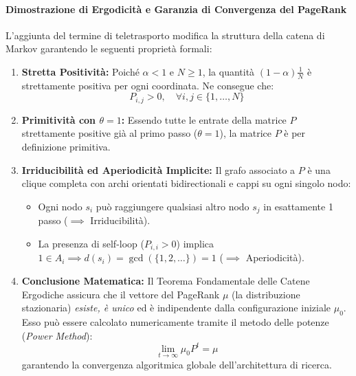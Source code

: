 \paragraph{Dimostrazione di Ergodicità e Garanzia di Convergenza del PageRank}
L'aggiunta del termine di teletrasporto modifica la struttura della catena di Markov garantendo le seguenti proprietà formali:
\begin{enumerate}
    \item \textbf{Stretta Positività:} Poiché $\alpha < 1$ e $N \ge 1$, la quantità $(1 - \alpha)\frac{1}{N}$ è strettamente positiva per ogni coordinata. Ne consegue che:
    \begin{equation*}
    P_{i,j} > 0, \quad \forall i, j \in \{1, \dots, N\}
    \end{equation*}
    \item \textbf{Primitività con $\theta = 1$:} Essendo tutte le entrate della matrice $P$ strettamente positive già al primo passo ($\theta = 1$), la matrice $P$ è per definizione primitiva.
    \item \textbf{Irriducibilità ed Aperiodicità Implicite:} Il grafo associato a $P$ è una clique completa con archi orientati bidirectionali e cappi su ogni singolo nodo:
    \begin{itemize}
        \item Ogni nodo $s_i$ può raggiungere qualsiasi altro nodo $s_j$ in esattamente 1 passo ($\implies$ Irriducibilità).
        \item La presenza di self-loop ($P_{i,i} > 0$) implica $1 \in A_i \implies d(s_i) = \gcd(\{1, 2, \dots\}) = 1$ ($\implies$ Aperiodicità).
    \end{itemize}
    \item \textbf{Conclusione Matematica:} Il Teorema Fondamentale delle Catene Ergodiche assicura che il vettore del PageRank $\mu$ (la distribuzione stazionaria) \emph{esiste, è unico} ed è indipendente dalla configurazione iniziale $\mu_0$. Esso può essere calcolato numericamente tramite il metodo delle potenze (\emph{Power Method}):
    \begin{equation*}
    \lim_{t \to \infty} \mu_0 P^t = \mu
    \end{equation*}
    garantendo la convergenza algoritmica globale dell'architettura di ricerca.
\end{enumerate}


